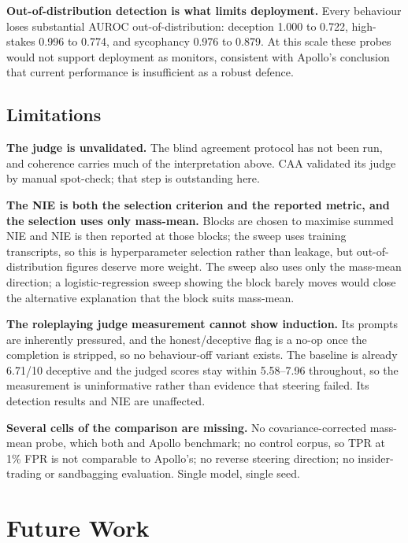 \documentclass[conference]{IEEEtran}
\begin{document}
\textbf{Out-of-distribution detection is what limits deployment.} Every behaviour loses
substantial AUROC out-of-distribution: deception 1.000 to 0.722, high-stakes 0.996
to 0.774, and sycophancy 0.976 to 0.879. At this scale these probes would not
support deployment as monitors, consistent with Apollo's conclusion that current
performance is insufficient as a robust defence.

\subsection{Limitations}
\label{sec:limitations}

\textbf{The judge is unvalidated.} The blind agreement protocol has not been run,
and coherence carries much of the interpretation above. CAA validated its judge by
manual spot-check; that step is outstanding here.

\textbf{The NIE is both the selection criterion and the reported metric, and
the selection uses only mass-mean.} Blocks are chosen to maximise
summed NIE and NIE is then reported at those blocks; the sweep uses training
transcripts, so this is hyperparameter selection rather than leakage, but
out-of-distribution figures deserve more weight. The sweep also uses only the
mass-mean direction; a logistic-regression sweep showing the block barely moves
would close the alternative explanation that the block suits mass-mean.

\textbf{The roleplaying judge measurement cannot show induction.} Its prompts are
inherently pressured, and the honest/deceptive flag is a no-op once the completion
is stripped, so no behaviour-off variant exists. The baseline is already 6.71/10
deceptive and the judged scores stay within 5.58--7.96 throughout, so the
measurement is uninformative rather than evidence that steering failed. Its
detection results and NIE are unaffected.

\textbf{Several cells of the comparison are missing.} No covariance-corrected
mass-mean probe, which both
\citet{marks2024} and Apollo benchmark; no control corpus, so TPR at 1\% FPR is
not comparable to Apollo's; no reverse steering direction; no insider-trading or
sandbagging evaluation. Single model, single seed.

\section{Future Work}
\end{document}
